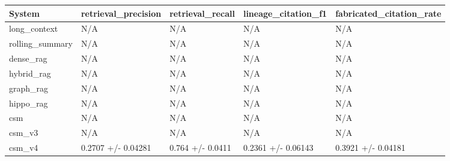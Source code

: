 \begin{tabular}{lllll}
System & retrieval_precision & retrieval_recall & lineage_citation_f1 & fabricated_citation_rate \\
\hline
long\_context & N/A & N/A & N/A & N/A \\
rolling\_summary & N/A & N/A & N/A & N/A \\
dense\_rag & N/A & N/A & N/A & N/A \\
hybrid\_rag & N/A & N/A & N/A & N/A \\
graph\_rag & N/A & N/A & N/A & N/A \\
hippo\_rag & N/A & N/A & N/A & N/A \\
csm & N/A & N/A & N/A & N/A \\
csm\_v3 & N/A & N/A & N/A & N/A \\
csm\_v4 & 0.2707 +/- 0.04281 & 0.764 +/- 0.0411 & 0.2361 +/- 0.06143 & 0.3921 +/- 0.04181 \\
\end{tabular}
